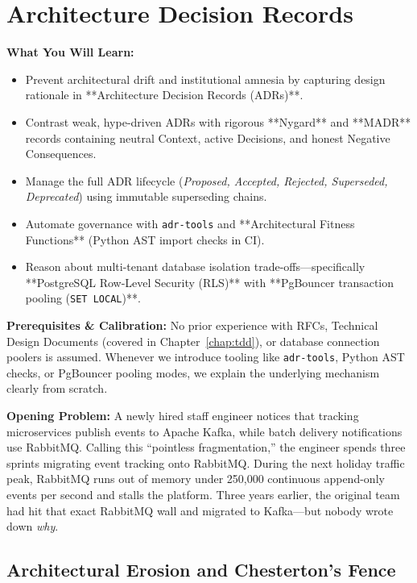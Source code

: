 \chapter{Architecture Decision Records}
\label{chap:adrs}

\begin{chaptergoalsbox}
\textbf{What You Will Learn:}
\begin{itemize}[leftmargin=12pt]
  \item Prevent architectural drift and institutional amnesia by capturing design rationale in **Architecture Decision Records (ADRs)**.
  \item Contrast weak, hype-driven ADRs with rigorous **Nygard** and **MADR** records containing neutral Context, active Decisions, and honest Negative Consequences.
  \item Manage the full ADR lifecycle (\textit{Proposed, Accepted, Rejected, Superseded, Deprecated}) using immutable superseding chains.
  \item Automate governance with \texttt{adr-tools} and **Architectural Fitness Functions** (Python AST import checks in CI).
  \item Reason about multi-tenant database isolation trade-offs—specifically **PostgreSQL Row-Level Security (RLS)** with **PgBouncer transaction pooling (\texttt{SET LOCAL})**.
\end{itemize}

\textbf{Prerequisites \& Calibration:}
No prior experience with RFCs, Technical Design Documents (covered in Chapter~\ref{chap:tdd}), or database connection poolers is assumed. Whenever we introduce tooling like \texttt{adr-tools}, Python AST checks, or PgBouncer pooling modes, we explain the underlying mechanism clearly from scratch.

\textbf{Opening Problem:}
A newly hired staff engineer notices that tracking microservices publish events to Apache Kafka, while batch delivery notifications use RabbitMQ. Calling this ``pointless fragmentation,'' the engineer spends three sprints migrating event tracking onto RabbitMQ. During the next holiday traffic peak, RabbitMQ runs out of memory under 250,000 continuous append-only events per second and stalls the platform. Three years earlier, the original team had hit that exact RabbitMQ wall and migrated to Kafka---but nobody wrote down \emph{why}.
\end{chaptergoalsbox}

\section{Architectural Erosion and Chesterton's Fence}

